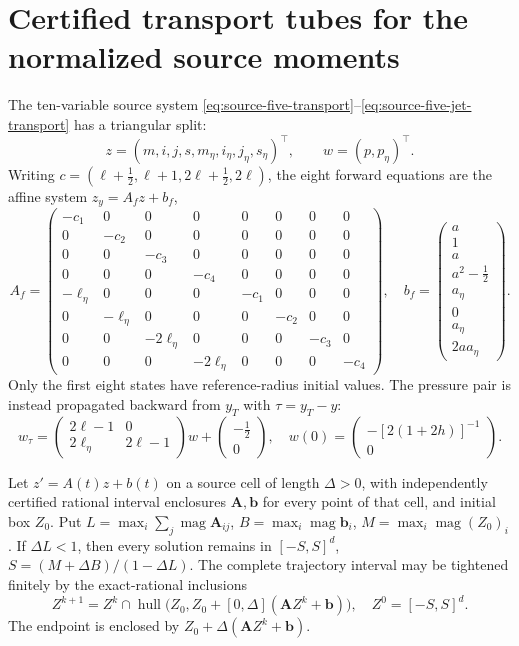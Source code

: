 \section{Certified transport tubes for the normalized source moments}
\label{sec:source-moment-interval-tubes}
The ten-variable source system \eqref{eq:source-five-transport}--\eqref{eq:source-five-jet-transport} has a triangular split:
\[
z=(m,i,j,s,m_\eta,i_\eta,j_\eta,s_\eta)^\top,\qquad
w=(p,p_\eta)^\top.
\]
Writing $c=(\ell+\tfrac12,\ell+1,2\ell+\tfrac12,2\ell)$,
the eight forward equations are the affine system $z_y=A_fz+b_f$,
\[
A_f=
\begin{pmatrix}
-c_1&0&0&0&0&0&0&0\\
0&-c_2&0&0&0&0&0&0\\
0&0&-c_3&0&0&0&0&0\\
0&0&0&-c_4&0&0&0&0\\
-\ell_\eta&0&0&0&-c_1&0&0&0\\
0&-\ell_\eta&0&0&0&-c_2&0&0\\
0&0&-2\ell_\eta&0&0&0&-c_3&0\\
0&0&0&-2\ell_\eta&0&0&0&-c_4
\end{pmatrix},\quad
b_f=\begin{pmatrix}a\\1\\a\\a^2-\tfrac12\\a_\eta\\0\\a_\eta\\2aa_\eta\end{pmatrix}.
\]
Only the first eight states have reference-radius initial values.
The pressure pair is instead propagated backward from
$y_T$ with $\tau=y_T-y$:
\begin{equation}\label{eq:source-backward-pressure}
w_\tau=
\begin{pmatrix}2\ell-1&0\\2\ell_\eta&2\ell-1\end{pmatrix}w+
\begin{pmatrix}-\tfrac12\\0\end{pmatrix},\quad
w(0)=\begin{pmatrix}-[2(1+2h)]^{-1}\\0\end{pmatrix}.
\end{equation}
\begin{theorem}
\label{thm:source-exact-rational-tube}
Let $z'=A(t)z+b(t)$ on a source cell of length $\Delta>0$,
with independently certified rational interval enclosures
$\mathbf A,\mathbf b$ for every point of that cell, and initial
box $Z_0$. Put $L=\max_i\sum_j\operatorname{mag}\mathbf A_{ij}$,
$B=\max_i\operatorname{mag}\mathbf b_i$,
$M=\max_i\operatorname{mag}(Z_0)_i$.
If $\Delta L<1$, then every solution remains in
$[-S,S]^d$, $S=(M+\Delta B)/(1-\Delta L)$.
The complete trajectory interval may be tightened finitely
by the exact-rational inclusions
\[
Z^{k+1}=Z^k\cap
\operatorname{hull}\bigl(Z_0,Z_0+[0,\Delta](\mathbf A Z^k+\mathbf b)\bigr),
\quad Z^0=[-S,S]^d.
\]
The endpoint is enclosed by
$Z_0+\Delta(\mathbf A Z^k+\mathbf b)$.
\end{theorem}
